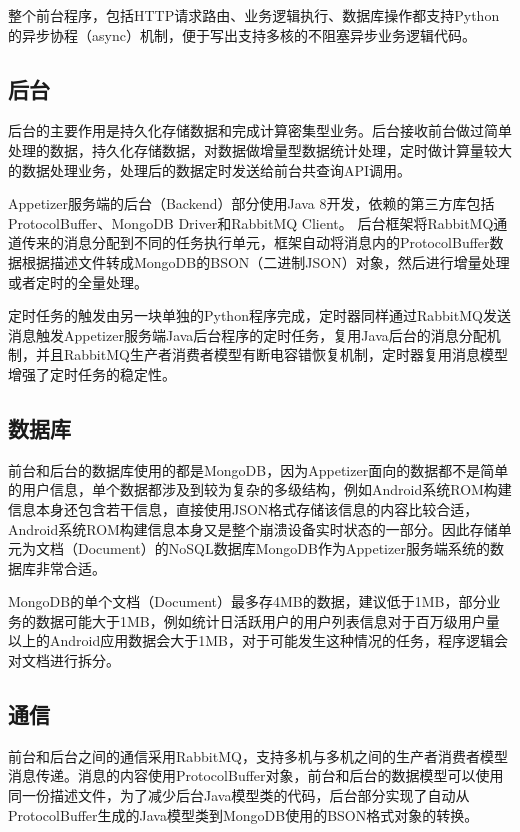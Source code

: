 整个前台程序，包括HTTP请求路由、业务逻辑执行、数据库操作都支持Python的异步协程（async）机制，便于写出支持多核的不阻塞异步业务逻辑代码。

\subsection{后台}

后台的主要作用是持久化存储数据和完成计算密集型业务。后台接收前台做过简单处理的数据，持久化存储数据，对数据做增量型数据统计处理，定时做计算量较大的数据处理业务，处理后的数据定时发送给前台共查询API调用。

Appetizer服务端的后台（Backend）部分使用Java 8开发，依赖的第三方库包括ProtocolBuffer、MongoDB Driver和RabbitMQ Client。
后台框架将RabbitMQ通道传来的消息分配到不同的任务执行单元，框架自动将消息内的ProtocolBuffer数据根据描述文件转成MongoDB的BSON（二进制JSON）对象，然后进行增量处理或者定时的全量处理。

定时任务的触发由另一块单独的Python程序完成，定时器同样通过RabbitMQ发送消息触发Appetizer服务端Java后台程序的定时任务，复用Java后台的消息分配机制，并且RabbitMQ生产者消费者模型有断电容错恢复机制，定时器复用消息模型增强了定时任务的稳定性。

\subsection{数据库}

前台和后台的数据库使用的都是MongoDB，因为Appetizer面向的数据都不是简单的用户信息，单个数据都涉及到较为复杂的多级结构，例如Android系统ROM构建信息本身还包含若干信息，直接使用JSON格式存储该信息的内容比较合适，Android系统ROM构建信息本身又是整个崩溃设备实时状态的一部分。因此存储单元为文档（Document）的NoSQL数据库MongoDB作为Appetizer服务端系统的数据库非常合适。

MongoDB的单个文档（Document）最多存4MB的数据，建议低于1MB，部分业务的数据可能大于1MB，例如统计日活跃用户的用户列表信息对于百万级用户量以上的Android应用数据会大于1MB，对于可能发生这种情况的任务，程序逻辑会对文档进行拆分。

\subsection{通信}

前台和后台之间的通信采用RabbitMQ，支持多机与多机之间的生产者消费者模型消息传递。消息的内容使用ProtocolBuffer对象，前台和后台的数据模型可以使用同一份描述文件，为了减少后台Java模型类的代码，后台部分实现了自动从ProtocolBuffer生成的Java模型类到MongoDB使用的BSON格式对象的转换。


